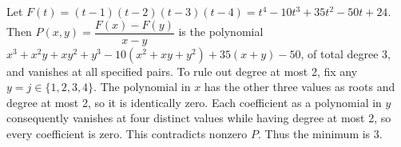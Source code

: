Let $F(t)=(t-1)(t-2)(t-3)(t-4)=t^4-10t^3+35t^2-50t+24$. Then $P(x,y)=\dfrac{F(x)-F(y)}{x-y}$ is the polynomial $x^3+x^2y+xy^2+y^3-10(x^2+xy+y^2)+35(x+y)-50$, of total degree 3, and vanishes at all specified pairs. To rule out degree at most 2, fix any $y=j\in\{1,2,3,4\}$. The polynomial in $x$ has the other three values as roots and degree at most 2, so it is identically zero. Each coefficient as a polynomial in $y$ consequently vanishes at four distinct values while having degree at most 2, so every coefficient is zero. This contradicts nonzero $P$. Thus the minimum is $\boxed3$.
